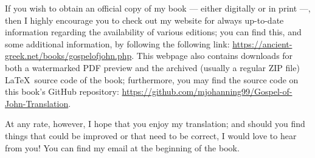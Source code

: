If you wish to obtain an official copy of my book — either digitally or in print —, then I highly encourage you to check out my website for always up-to-date information regarding the availability of various editions; you can find this, and some additional information, by following the following link: \url{https://ancient-greek.net/books/gospelofjohn.php}. This webpage also contains downloads for both a watermarked PDF preview and the archived (usually a regular ZIP file) \LaTeX\ source code of the book; furthermore, you may find the source code on this book’s GitHub repository: \url{https://github.com/mjohanning99/Gospel-of-John-Translation}.

At any rate, however, I hope that you enjoy my translation; and should you find things that could be improved or that need to be correct, I would love to hear from you! You can find my email at the beginning of the book. 